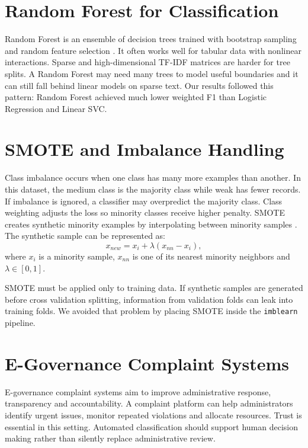 \documentclass[12pt,a4paper,openany]{book}
\begin{document}
\section{Random Forest for Classification}
Random Forest is an ensemble of decision trees trained with bootstrap sampling and random feature selection \cite{breiman2001random}. It often works well for tabular data with nonlinear interactions. Sparse and high-dimensional TF-IDF matrices are harder for tree splits. A Random Forest may need many trees to model useful boundaries and it can still fall behind linear models on sparse text. Our results followed this pattern: Random Forest achieved much lower weighted F1 than Logistic Regression and Linear SVC.

\section{SMOTE and Imbalance Handling}
Class imbalance occurs when one class has many more examples than another. In this dataset, the medium class is the majority class while weak has fewer records. If imbalance is ignored, a classifier may overpredict the majority class. Class weighting adjusts the loss so minority classes receive higher penalty. SMOTE creates synthetic minority examples by interpolating between minority samples \cite{chawla2002smote}. The synthetic sample can be represented as:
\begin{equation}
x_{new}=x_i+\lambda(x_{nn}-x_i),
\end{equation}
where $x_i$ is a minority sample, $x_{nn}$ is one of its nearest minority neighbors and $\lambda \in [0,1]$.

SMOTE must be applied only to training data. If synthetic samples are generated before cross validation splitting, information from validation folds can leak into training folds. We avoided that problem by placing SMOTE inside the \texttt{imblearn} pipeline.

\section{E-Governance Complaint Systems}
E-governance complaint systems aim to improve administrative response, transparency and accountability. A complaint platform can help administrators identify urgent issues, monitor repeated violations and allocate resources. Trust is essential in this setting. Automated classification should support human decision making rather than silently replace administrative review.
\end{document}
